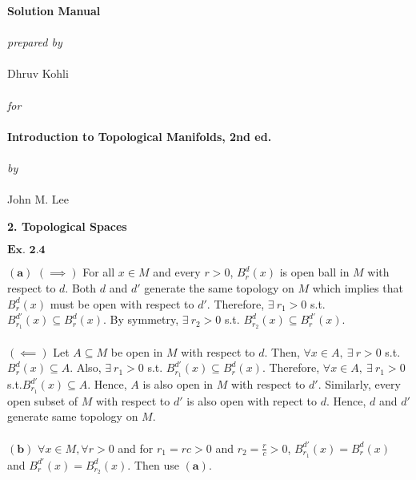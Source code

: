 \documentclass{article}
\begin{document}
\raggedright


\begin{center}
    \textbf{\Large{Solution Manual}}\\~\\
    \textit{prepared by}\\~\\
    Dhruv Kohli\\~\\
    \textit{for}\\~\\
    \textbf{\Large{Introduction to Topological Manifolds, 2nd ed.}}\\~\\
    \textit{by}\\~\\
    \large{John M. Lee}~\\
\end{center}
\clearpage

\begin{center}
    \textbf{\large{2. Topological Spaces}}
\end{center}

${\textbf{Ex. 2.4}}$

$\mathbf{(a)}$ $(\implies)$ For all $x \in M$ and every $r > 0$, $B_{r}^{d}(x)$ is open ball in $M$ with respect to $d$. Both $d$ and $d'$ generate the same topology on $M$ which implies that $B_{r}^{d}(x)$ must be open with respect to $d'$. Therefore, $\exists\ r_1>0$ s.t. $B_{r_1}^{d'}(x) \subseteq B_{r}^{d}(x)$. By symmetry, $\exists\ r_2>0$ s.t. $B_{r_2}^{d}(x) \subseteq B_{r}^{d'}(x)$.\\~\\

$(\impliedby)$ Let $A \subseteq M$ be open in $M$ with respect to $d$. Then, $\forall x \in A, \ \exists \ r>0$ s.t. $B_{r}^{d}(x) \subseteq A$. Also, $\exists\ r_1>0$ s.t. $B_{r_1}^{d'}(x) \subseteq B_{r}^{d}(x)$. Therefore, $\forall x \in A, \ \exists \ r_1>0$ s.t.$B_{r_1}^{d'}(x) \subseteq A$. Hence, $A$ is also open in $M$ with respect to $d'$. Similarly, every open subset of $M$ with respect to $d'$ is also open with repect to $d$. Hence, $d$ and $d'$ generate same topology on $M$.\\~\\

$\mathbf{(b)}$ $\forall x \in M, \forall r>0$ and for $r_1 = rc > 0$ and $r_2 = \frac{r}{c} > 0$, $B_{r_1}^{d'}(x) = B_{r}^{d}(x)$ and $B_{r}^{d'}(x) = B_{r_2}^{d}(x)$. Then use ${\mathbf{(a)}}$.\\~\\
\end{document}
